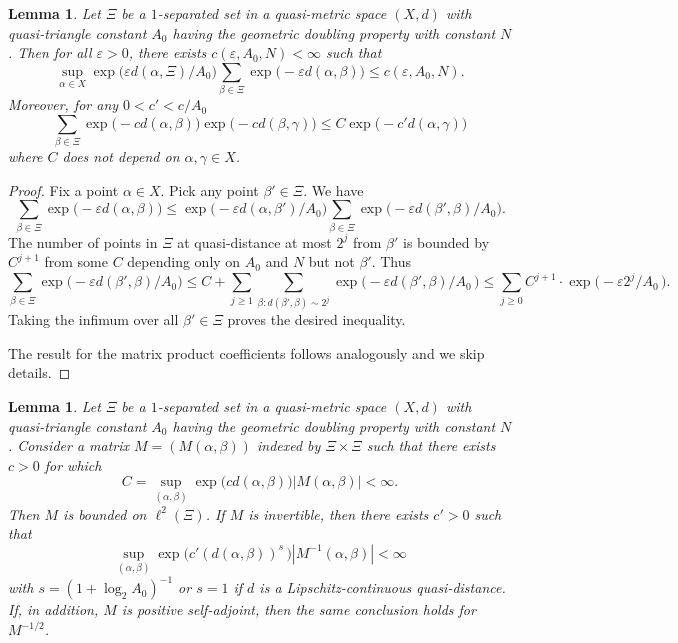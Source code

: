 \documentclass{amsart}
\numberwithin{equation}{section}
\theoremstyle{plain}
\newtheorem{lemma}[equation]{Lemma}
\theoremstyle{definition}
\theoremstyle{remark}
\begin{document}
{{\begin{lemma}\label{lemma1} Let $\Xi$ be a $1$-separated set in   a quasi-metric space $(X,d)$ with quasi-triangle constant $A_{0}$ having the geometric doubling property with constant $N$. Then   for all $\varepsilon>0$, there exists $c(\varepsilon,A_{0},N)<\infty$ such that 
$$
\sup_{\alpha \in X}{\exp\big( \varepsilon d(\alpha, \Xi)/A_{0}\big)} \sum_{\beta \in \Xi} \exp\big(- \varepsilon d(\alpha,\beta)\big) \le c(\varepsilon,A_{0},N). 
$$
 Moreover,
for any $0<c'<c/A_{0}$
$$
 \sum_{\beta \in \Xi}  \exp\big(- c d(\alpha,\beta)\big) \exp\big(- c d(\beta,\gamma)\big) \le C \exp\big(- c' d(\alpha,\gamma)\big)
$$
where $C$ does not depend on $\alpha,\gamma \in X$.
\end{lemma}

\begin{proof} Fix a point $\alpha \in X$.  Pick any point $\beta'\in \Xi$. We have
$$
 \sum_{\beta \in \Xi} \exp\big(- \varepsilon d(\alpha,\beta)\big) \le  \exp\big(- \varepsilon d(\alpha,\beta')/A_{0}\big)   \sum_{\beta \in \Xi} \exp\big(- \varepsilon d(\beta',\beta)/A_{0}\big).
 $$
The number  of points in $\Xi$ at quasi-distance 
at most $2^j$ from $\beta'$ is bounded by $C^{j+1}$ from some $C$ depending only on $A_{0}$ and $N$ but not $\beta'$. Thus
$$\sum_{\beta \in \Xi} \exp\big(- \varepsilon d(\beta',\beta)/A_{0}\big) \le C+  \sum_{j\ge 1}  \sum_{\beta: d(\beta',\beta)\sim 2^j}  \exp\big(- \varepsilon d(\beta',\beta)/A_{0}\, \big)  \le \sum_{j\ge 0} C^{j+1} \cdot
\exp\big(- \varepsilon 2^j/A_{0}\, \big).$$
Taking the infimum over all $\beta'\in \Xi$ proves the desired inequality.

The result for the matrix product coefficients follows analogously and we skip details. 
\end{proof}

\begin{lemma}\label{lemma2} Let $\Xi$ be a $1$-separated set in   a quasi-metric space $(X,d)$ with quasi-triangle constant $A_{0}$ having the geometric doubling property with constant $N$. Consider a matrix  $M=(M(\alpha,\beta))$ indexed by $\Xi\times \Xi$ such that there exists $c>0$ for which
$$
C=\sup_{(\alpha,\beta)} \exp\big(c d(\alpha,\beta)\big) |M(\alpha,\beta)| <\infty.
$$
Then $M$ is bounded on $\ell^2(\Xi)$. 
If $M$ is invertible, then there exists $c'>0$ such that  
$$
\sup_{(\alpha,\beta)} \exp\big(c' (d(\alpha,\beta))^s\, \big) |M^{-1}(\alpha,\beta)| <\infty
$$
with  $s=(1+\log_{2} A_{0})^{-1}$ or $s=1$ if $d$ is a Lipschitz-continuous quasi-distance. If, in addition, $M$ is positive self-adjoint, then the same conclusion holds for $M^{-1/2}$.
\end{lemma}

}}
\end{document}
